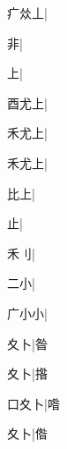 \begin{multicols}{2}
{{\cjk{}疒{\cnxb{}𠈌}丄}\mktsJzrVerticalBar{}{\cjk{}{\cnsym{}　}{\cnsym{}　}{\cnsym{}　}}|{}\par
{非}\mktsJzrVerticalBar{}{\cjk{}{\cnsym{}　}{\cnsym{}　}{\cnsym{}　}}|{}\par
{\cjk{}{\cnsym{}　}{\cnsym{}　}上}\mktsJzrVerticalBar{}{\cjk{}{\cnsym{}　}{\cnsym{}　}{\cnsym{}　}}|{}\par
{\cjk{}酉尤上}\mktsJzrVerticalBar{}{\cjk{}{\cnsym{}　}{\cnsym{}　}{\cnsym{}　}}|{}\par
{\cjk{}禾尤上}\mktsJzrVerticalBar{}{\cjk{}{\cnsym{}　}{\cnsym{}　}{\cnsym{}　}}|{}\par
{\cjk{}禾尤上}\mktsJzrVerticalBar{}{\cjk{}{\cnsym{}　}{\cnsym{}　}{\cnsym{}　}}|{}\par
{比上}\mktsJzrVerticalBar{}{\cjk{}{\cnsym{}　}{\cnsym{}　}{\cnsym{}　}}|{}\par
{\cjk{}{\cnsym{}　}{\cnsym{}　}止}\mktsJzrVerticalBar{}{\cjk{}{\cnsym{}　}{\cnsym{}　}{\cnsym{}　}}|{}\par
{\cjk{}{\cnsym{}　}禾{\cnxHanaA{}刂}}\mktsJzrVerticalBar{}{\cjk{}{\cnsym{}　}{\cnsym{}　}{\cnsym{}　}}|{}\par
{\cjk{}{\cnsym{}　}二小}\mktsJzrVerticalBar{}{\cjk{}{\cnsym{}　}{\cnsym{}　}{\cnsym{}　}}|{}\par
{\cjk{}广小小}\mktsJzrVerticalBar{}{\cjk{}{\cnsym{}　}{\cnsym{}　}{\cnsym{}　}}|{}\par
{\cjk{}{\cnsym{}　}夊卜}\mktsJzrVerticalBar{}{\cjk{}{\cnsym{}　}{\cnsym{}　}{\cnsym{}　}}|{\cjk{}昝}\par
{夊卜}\mktsJzrVerticalBar{}{\cjk{}{\cnsym{}　}{\cnsym{}　}{\cnsym{}　}}|{\cjk{}揝}\par
{\cjk{}口夊卜}\mktsJzrVerticalBar{}{\cjk{}{\cnsym{}　}{\cnsym{}　}{\cnsym{}　}}|{\cjk{}喒}\par
{夊卜}\mktsJzrVerticalBar{}{\cjk{}{\cnsym{}　}{\cnsym{}　}{\cnsym{}　}}|{\cjk{}偺}\par
}
\end{multicols}
